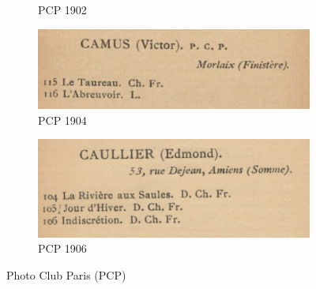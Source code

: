 \documentclass[a4paper,12pt,twoside]{book}
\begin{document}
\begin{figure}
\begin{subfigure}{0.5\textwidth}
			\centering
			\caption{PCP 1902}
		\end{subfigure}
		\begin{subfigure}{0.5\textwidth}
		\includegraphics[scale=0.5]{PCP1904.png}
		\centering
		\caption{PCP 1904}
		\end{subfigure}
		\begin{subfigure}{0.5\textwidth}
		\includegraphics[scale=0.4]{PCP1906.png}
		\centering
		\caption{PCP 1906}
		\end{subfigure}
	\caption{Photo Club Paris (PCP)}
	\end{figure}
	
	
	
\end{document}
